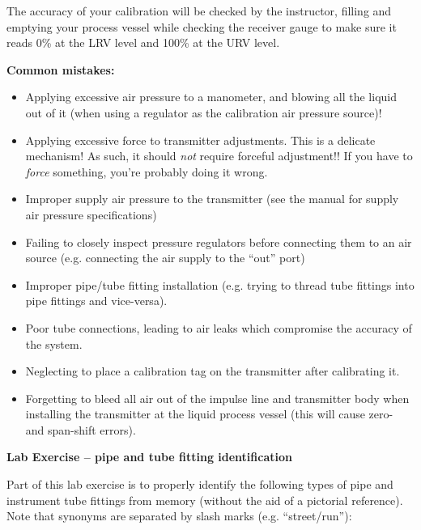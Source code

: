 The accuracy of your calibration will be checked by the instructor, filling and emptying your process vessel while checking the receiver gauge to make sure it reads 0\% at the LRV level and 100\% at the URV level.

\vskip 10pt

{\bf Common mistakes:}

\begin{itemize}
\item{} Applying excessive air pressure to a manometer, and blowing all the liquid out of it (when using a regulator as the calibration air pressure source)!
\item{} Applying excessive force to transmitter adjustments.  This is a delicate mechanism!  As such, it should {\it not} require forceful adjustment!!  If you have to {\it force} something, you're probably doing it wrong.
\item{} Improper supply air pressure to the transmitter (see the manual for supply air pressure specifications)
\item{} Failing to closely inspect pressure regulators before connecting them to an air source (e.g. connecting the air supply to the ``out'' port)
\item{} Improper pipe/tube fitting installation (e.g. trying to thread tube fittings into pipe fittings and vice-versa).
\item{} Poor tube connections, leading to air leaks which compromise the accuracy of the system.
\item{} Neglecting to place a calibration tag on the transmitter after calibrating it.
\item{} Forgetting to bleed all air out of the impulse line and transmitter body when installing the transmitter at the liquid process vessel (this will cause zero- and span-shift errors).
\end{itemize}






\vfil \eject

\noindent
{\bf Lab Exercise -- pipe and tube fitting identification}

\vskip 5pt

Part of this lab exercise is to properly identify the following types of pipe and instrument tube fittings from memory (without the aid of a pictorial reference).  Note that synonyms are separated by slash marks (e.g. ``street/run''):

\vskip 10pt


